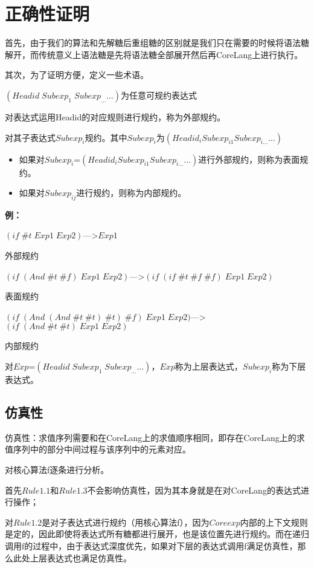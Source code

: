 \section{正确性证明}

首先，由于我们的算法和先解糖后重组糖的区别就是我们只在需要的时候将语法糖解开，而传统意义上语法糖是先将语法糖全部展开然后再CoreLang上进行执行。

其次，为了证明方便，定义一些术语。

$(Headid\;Subexp_{1}\;Subexp_{\ldots} \ldots)$为任意可规约表达式

对表达式运用Headid的对应规则进行规约，称为外部规约。

对其子表达式$Subexp_{i}$规约。其中$Subexp_{i}$为$(Headid_{i} Subexp_{i1} Subexp_{i\ldots} \ldots)$
\begin{itemize}
	\item 如果对$Subexp_{i}$=$(Headid_{i} Subexp_{i1} Subexp_{i\ldots} \ldots)$进行外部规约，则称为表面规约。
	\item 如果对$Subexp_{ij}$进行规约，则称为内部规约。
\end{itemize}

{\bfseries 例：}

$(if\; \#t\; Exp1\; Exp2)$--->$Exp1$ \begin{flushright}外部规约\end{flushright}

$(if\; (And\; \#t\; \#f)\; Exp1\; Exp2)$--->$(if\; (if\; \#t\; \#f\; \#f)\; Exp1\; Exp2)$ \begin{flushright}表面规约\end{flushright}

$(if\; (And\; (And\; \#t\; \#t)\; \#t)\; \#f)\; Exp1\; Exp2)$--->$(if\; (And\; \#t\; \#t)\; Exp1\; Exp2)$ \begin{flushright}内部规约\end{flushright}

对$Exp$=$(Headid\;Subexp_{1}\;Subexp_{\ldots} \ldots)$，$Exp$称为上层表达式，$Subexp_{i}$称为下层表达式。
\subsection{仿真性}
仿真性：求值序列需要和在CoreLang上的求值顺序相同，即存在CoreLang上的求值序列中的部分中间过程与该序列中的元素对应。

对核心算法f逐条进行分析。

首先$Rule1.1$和$Rule1.3$不会影响仿真性，因为其本身就是在对CoreLang的表达式进行操作；

对$Rule1.2$是对子表达式进行规约（用核心算法f），因为$Coreexp$内部的上下文规则是定的，因此即使将表达式所有糖都进行展开，也是该位置先进行规约。而在递归调用f的过程中，由于表达式深度优先，如果对下层的表达式调用f满足仿真性，那么此处上层表达式也满足仿真性。

